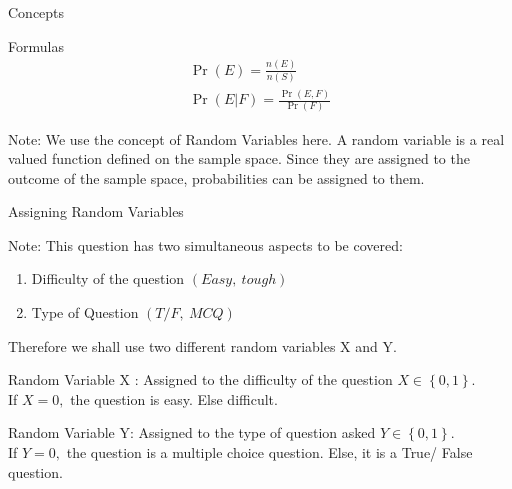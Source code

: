 \documentclass{beamer}
\providecommand{\pr}[1]{\ensuremath{\Pr\left(#1\right)}}
\providecommand{\brak}[1]{\ensuremath{\left(#1\right)}}
\providecommand{\cbrak}[1]{\ensuremath{\left\{#1\right\}}}
\numberwithin{equation}{subsection}
\begin{document}
\begin{frame}{Concepts}

\begin{block}{Formulas}
    \begin{align}
        \pr{E} = \frac{n(E)}{n(S)}\\
        \pr{E|F} = \frac{\pr{E,F}}{\pr{F}}
    \end{align}
\end{block}
    
\begin{alertblock}{Note:}
    We use the concept of Random Variables here. A random variable is a real valued function defined on the sample space. Since they are assigned to the outcome of the sample space, probabilities can be assigned to them.
\end{alertblock}

\end{frame}

\begin{frame}{Assigning Random Variables}

    \begin{alertblock}{Note:}
        This question has two simultaneous aspects to be covered:
        \begin{enumerate}
            \item Difficulty of the question \brak{Easy,\ tough}
            \item Type of Question \brak{T/F,\ MCQ}
        \end{enumerate}
        Therefore we shall use two different random variables X and Y.
    \end{alertblock}
    
    \begin{block}{Random Variable X : Assigned to the difficulty of the question}
        $X \in \cbrak{0, 1}$. \\ If $X = 0,$ the question is easy. Else difficult.\\
    \end{block}
    
    \begin{block}{Random Variable Y: Assigned to the type of question asked}
        $Y \in \cbrak{0, 1}$. \\ If $Y = 0,$ the question is a multiple choice question. Else, it is a True/ False question.
    \end{block}
    
\end{frame}
\end{document}
